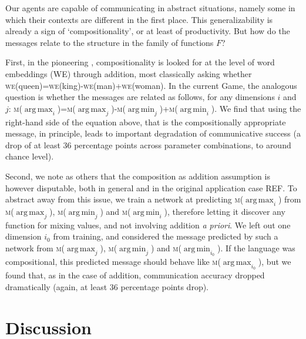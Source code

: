 \documentclass[11pt,a4paper]{article}
\DeclareMathOperator*{\argmax}{arg\,max}
\DeclareMathOperator*{\argmin}{arg\,min}
\newcommand{\nbEC}[1]{{\leavevmode\color{blue}{\scriptsize#1}}}
\newcommand{\addEC}[1]{{\leavevmode\color{blue}#1}}
\begin{document}
Our agents are capable of communicating in abstract situations, namely some in which their contexts are different in the first place. This generalizability is already a sign of `compositionality', or at least of productivity. But how do the messages relate to the structure in the family of functions $F$? 

\newcommand{\WE}[1]{\textsc{we}(#1)}
\newcommand{\MESS}[1]{\textsc{m}(#1)}

First, in the pioneering \citealp{mikolov_efficient_2013}, compositionality is looked for at the level of word embeddings (WE) through addition, most classically asking whether  
\WE{queen}=\WE{king}-\WE{man}+\WE{woman}. In the current Game, the analogous question is whether the messages are related as follows, for any dimensions $i$ and $j$:
\MESS{$\argmax_i$}=\MESS{$\argmax_j$}-\MESS{$\argmin_j$}+\MESS{$\argmin_i$}. We find that using the right-hand side of the equation above, that is the compositionally appropriate message, in principle, leads to important degradation of communicative success (a drop of at least 36 percentage points across parameter combinations, to around chance level).

Second, we note as others that the composition as addition assumption is however disputable, both in general and in the original application case \addEC{REF}. To abstract away from this issue, we train a network at predicting 
\MESS{$\argmax_i$} from \MESS{$\argmax_j$}, \MESS{$\argmin_j$} and \MESS{$\argmin_i$}, therefore letting it discover any function for mixing values, and not involving addition \emph{a priori}. We left out one dimension $i_0$ from training, and considered the message predicted by such a network from \MESS{$\argmax_j$}, \MESS{$\argmin_j$} and \MESS{$\argmin_{i_0}$}. If the language was compositional, this predicted message should behave like \MESS{$\argmax_{i_0}$}, but we found that, as in the case of addition, communication accuracy dropped dramatically (again, at least 36 percentage points drop).
\nbEC{cite Baroni's (or others) similar tests?}


\section{Discussion}
\end{document}
